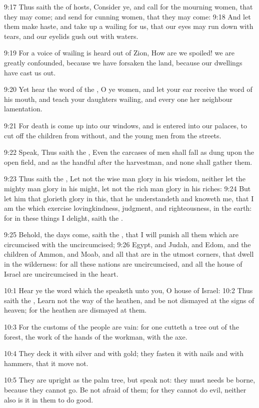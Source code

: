 9:17 Thus saith the \LORD of hosts, Consider ye, and call for the
mourning women, that they may come; and send for cunning women, that
they may come: 9:18 And let them make haste, and take up a wailing for
us, that our eyes may run down with tears, and our eyelids gush out
with waters.

9:19 For a voice of wailing is heard out of Zion, How are we spoiled!
we are greatly confounded, because we have forsaken the land, because
our dwellings have cast us out.

9:20 Yet hear the word of the \LORD, O ye women, and let your ear
receive the word of his mouth, and teach your daughters wailing, and
every one her neighbour lamentation.

9:21 For death is come up into our windows, and is entered into our
palaces, to cut off the children from without, and the young men from
the streets.

9:22 Speak, Thus saith the \LORD, Even the carcases of men shall fall
as dung upon the open field, and as the handful after the harvestman,
and none shall gather them.

9:23 Thus saith the \LORD, Let not the wise man glory in his wisdom,
neither let the mighty man glory in his might, let not the rich man
glory in his riches: 9:24 But let him that glorieth glory in this,
that he understandeth and knoweth me, that I am the \LORD which
exercise lovingkindness, judgment, and righteousness, in the earth:
for in these things I delight, saith the \LORD.

9:25 Behold, the days come, saith the \LORD, that I will punish all
them which are circumcised with the uncircumcised; 9:26 Egypt, and
Judah, and Edom, and the children of Ammon, and Moab, and all that are
in the utmost corners, that dwell in the wilderness: for all these
nations are uncircumcised, and all the house of Israel are
uncircumcised in the heart.

10:1 Hear ye the word which the \LORD speaketh unto you, O house of
Israel: 10:2 Thus saith the \LORD, Learn not the way of the heathen,
and be not dismayed at the signs of heaven; for the heathen are
dismayed at them.

10:3 For the customs of the people are vain: for one cutteth a tree
out of the forest, the work of the hands of the workman, with the axe.

10:4 They deck it with silver and with gold; they fasten it with nails
and with hammers, that it move not.

10:5 They are upright as the palm tree, but speak not: they must needs
be borne, because they cannot go. Be not afraid of them; for they
cannot do evil, neither also is it in them to do good.

